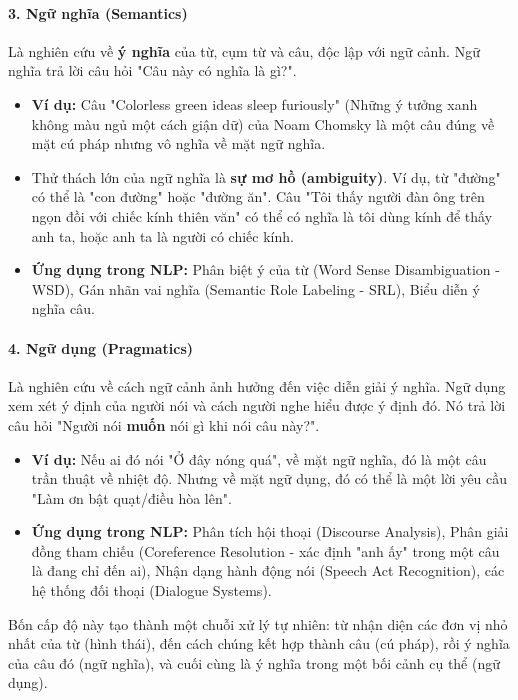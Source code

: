 \paragraph{3. Ngữ nghĩa (Semantics)}
Là nghiên cứu về \textbf{ý nghĩa} của từ, cụm từ và câu, độc lập với ngữ cảnh. Ngữ nghĩa trả lời câu hỏi "Câu này có nghĩa là gì?".
\begin{itemize}
    \item \textbf{Ví dụ:} Câu "Colorless green ideas sleep furiously" (Những ý tưởng xanh không màu ngủ một cách giận dữ) của Noam Chomsky là một câu đúng về mặt cú pháp nhưng vô nghĩa về mặt ngữ nghĩa.
    \item Thử thách lớn của ngữ nghĩa là \textbf{sự mơ hồ (ambiguity)}. Ví dụ, từ "đường" có thể là "con đường" hoặc "đường ăn". Câu "Tôi thấy người đàn ông trên ngọn đồi với chiếc kính thiên văn" có thể có nghĩa là tôi dùng kính để thấy anh ta, hoặc anh ta là người có chiếc kính.
    \item \textbf{Ứng dụng trong NLP:} Phân biệt ý của từ (Word Sense Disambiguation - WSD), Gán nhãn vai nghĩa (Semantic Role Labeling - SRL), Biểu diễn ý nghĩa câu.
\end{itemize}

\paragraph{4. Ngữ dụng (Pragmatics)}
Là nghiên cứu về cách ngữ cảnh ảnh hưởng đến việc diễn giải ý nghĩa. Ngữ dụng xem xét ý định của người nói và cách người nghe hiểu được ý định đó. Nó trả lời câu hỏi "Người nói \textbf{muốn} nói gì khi nói câu này?".
\begin{itemize}
    \item \textbf{Ví dụ:} Nếu ai đó nói "Ở đây nóng quá", về mặt ngữ nghĩa, đó là một câu trần thuật về nhiệt độ. Nhưng về mặt ngữ dụng, đó có thể là một lời yêu cầu "Làm ơn bật quạt/điều hòa lên".
    \item \textbf{Ứng dụng trong NLP:} Phân tích hội thoại (Discourse Analysis), Phân giải đồng tham chiếu (Coreference Resolution - xác định "anh ấy" trong một câu là đang chỉ đến ai), Nhận dạng hành động nói (Speech Act Recognition), các hệ thống đối thoại (Dialogue Systems).
\end{itemize}

Bốn cấp độ này tạo thành một chuỗi xử lý tự nhiên: từ nhận diện các đơn vị nhỏ nhất của từ (hình thái), đến cách chúng kết hợp thành câu (cú pháp), rồi ý nghĩa của câu đó (ngữ nghĩa), và cuối cùng là ý nghĩa trong một bối cảnh cụ thể (ngữ dụng).

